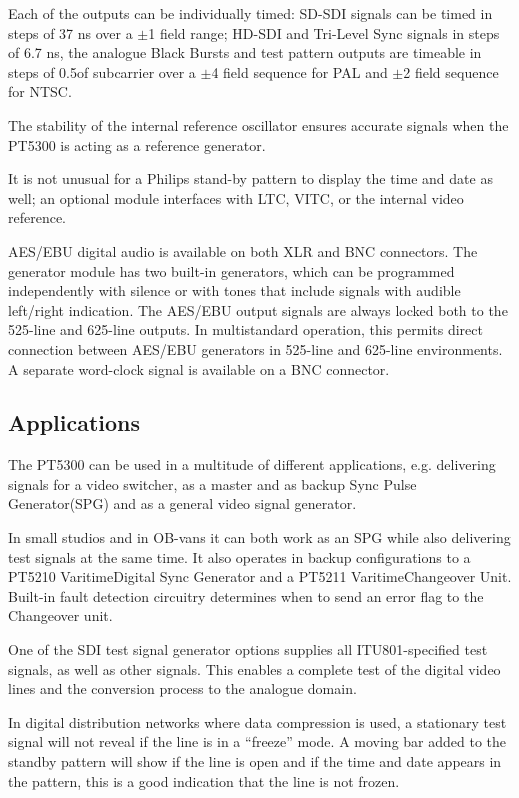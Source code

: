 Each of the outputs can be individually timed: SD-SDI signals can be timed in steps of 37 ns over a ${\pm}$1 field range; HD-SDI and Tri-Level Sync signals in steps of 6.7 ns, the analogue Black Bursts and test pattern outputs are timeable in steps of 0.5\degrees of subcarrier over a ${\pm}$4 field sequence for PAL and ${\pm}$2 field sequence for NTSC.

The stability of the internal reference oscillator ensures accurate signals when the PT5300 is acting as a reference generator.

It is not unusual for a Philips stand-by pattern to display the time and date as well; an optional module interfaces with LTC, VITC, or the internal video reference.

AES/EBU digital audio is available on both XLR and BNC connectors. The generator module has two built-in generators, which can be programmed independently with silence or with tones that include signals with audible left/right indication. The AES/EBU output signals are always locked both to the 525-line and 625-line outputs. In multistandard operation, this permits direct connection between AES/EBU generators in 525-line and 625-line environments. A separate word-clock signal is available on a BNC connector.

\subsection{Applications}
The PT5300 can be used in a multitude of different applications, e.g. delivering signals for a video switcher, as a master and as backup Sync Pulse Generator(SPG) and as a general video signal generator. 

In small studios and in OB-vans it can both work as an SPG while also delivering test signals at the same time. It also operates in backup configurations to a PT5210 Varitime\TM Digital Sync Generator and a PT5211 Varitime\TM Changeover Unit. Built-in fault detection circuitry determines when to send an error flag to the Changeover unit.

One of the SDI test signal generator options supplies all ITU801-specified test signals, as well as other signals. This enables a complete test of the digital video lines and the conversion process to the analogue domain.

In digital distribution networks where data compression is used, a stationary test signal will not reveal if the line is in a ``freeze'' mode. A moving bar added to the standby pattern will show if the line is open and if the time and date appears in the pattern, this is a good indication that the line is not frozen.


